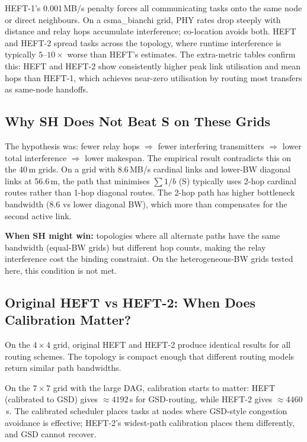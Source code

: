 \documentclass[11pt]{article}
\begin{document}
HEFT-1's 0.001\,MB/s penalty forces all communicating tasks onto the same
node or direct neighbours.  On a csma\_bianchi grid, PHY rates drop steeply
with distance and relay hops accumulate interference; co-location avoids both.
HEFT and HEFT-2 spread tasks across the topology, where runtime interference
is typically $5\text{--}10\times$ worse than HEFT's estimates.  The extra-metric
tables confirm this: HEFT and HEFT-2 show consistently higher peak link
utilisation and mean hops than HEFT-1, which achieves near-zero utilisation
by routing most transfers as same-node handoffs.

\subsection{Why SH Does Not Beat S on These Grids}

The hypothesis was: fewer relay hops $\Rightarrow$ fewer interfering transmitters
$\Rightarrow$ lower total interference $\Rightarrow$ lower makespan.  The
empirical result contradicts this on the 40\,m grids.  On a grid with 8.6\,MB/s
cardinal links and lower-BW diagonal links at 56.6\,m, the path that minimises
$\sum 1/b$ (S) typically uses 2-hop cardinal routes rather than 1-hop diagonal
routes.  The 2-hop path has higher bottleneck bandwidth (8.6 vs lower diagonal
BW), which more than compensates for the second active link.

\textbf{When SH might win:} topologies where all alternate paths have the same
bandwidth (equal-BW grids) but different hop counts, making the relay
interference cost the binding constraint.  On the heterogeneous-BW grids tested
here, this condition is not met.

\subsection{Original HEFT vs HEFT-2: When Does Calibration Matter?}

On the $4\times4$ grid, original HEFT and HEFT-2 produce identical results for
all routing schemes.  The topology is compact enough that different routing
models return similar path bandwidths.

On the $7\times7$ grid with the large DAG, calibration starts to matter: HEFT
(calibrated to GSD) gives $\approx4192$\,s for GSD-routing, while HEFT-2 gives
$\approx4460$\,s.  The calibrated scheduler places tasks at nodes where GSD-style
congestion avoidance is effective; HEFT-2's widest-path calibration places them
differently, and GSD cannot recover.
\end{document}
